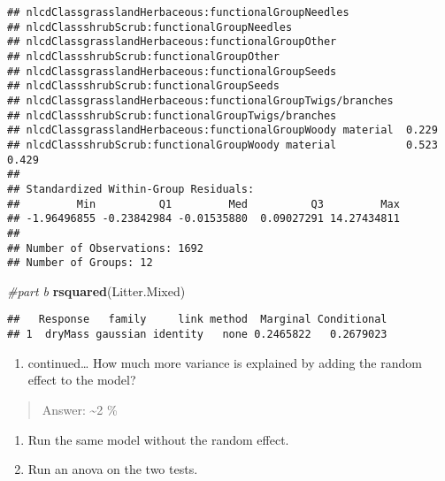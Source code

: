 \documentclass[]{article}
\newenvironment{Shaded}{\begin{snugshade}}{\end{snugshade}}
\newcommand{\CommentTok}[1]{\textcolor[rgb]{0.56,0.35,0.01}{\textit{#1}}}
\newcommand{\KeywordTok}[1]{\textcolor[rgb]{0.13,0.29,0.53}{\textbf{#1}}}
\newcommand{\NormalTok}[1]{#1}
\providecommand{\tightlist}{%
  \setlength{\itemsep}{0pt}\setlength{\parskip}{0pt}}
\begin{document}
\begin{verbatim}
## nlcdClassgrasslandHerbaceous:functionalGroupNeedles                     
## nlcdClassshrubScrub:functionalGroupNeedles                              
## nlcdClassgrasslandHerbaceous:functionalGroupOther                       
## nlcdClassshrubScrub:functionalGroupOther                                
## nlcdClassgrasslandHerbaceous:functionalGroupSeeds                       
## nlcdClassshrubScrub:functionalGroupSeeds                                
## nlcdClassgrasslandHerbaceous:functionalGroupTwigs/branches              
## nlcdClassshrubScrub:functionalGroupTwigs/branches                       
## nlcdClassgrasslandHerbaceous:functionalGroupWoody material  0.229       
## nlcdClassshrubScrub:functionalGroupWoody material           0.523  0.429
## 
## Standardized Within-Group Residuals:
##         Min          Q1         Med          Q3         Max 
## -1.96496855 -0.23842984 -0.01535880  0.09027291 14.27434811 
## 
## Number of Observations: 1692
## Number of Groups: 12
\end{verbatim}

\begin{Shaded}
\begin{Highlighting}[]
\CommentTok{#part b}
\KeywordTok{rsquared}\NormalTok{(Litter.Mixed)}
\end{Highlighting}
\end{Shaded}

\begin{verbatim}
##   Response   family     link method  Marginal Conditional
## 1  dryMass gaussian identity   none 0.2465822   0.2679023
\end{verbatim}

\begin{enumerate}
\def\labelenumi{\alph{enumi}.}
\setcounter{enumi}{1}
\tightlist
\item
  continued\ldots{} How much more variance is explained by adding the
  random effect to the model?
\end{enumerate}

\begin{quote}
Answer: \textasciitilde{}2 \%
\end{quote}

\begin{enumerate}
\def\labelenumi{\alph{enumi}.}
\setcounter{enumi}{2}
\tightlist
\item
  Run the same model without the random effect.
\item
  Run an anova on the two tests.
\end{enumerate}
\end{document}
